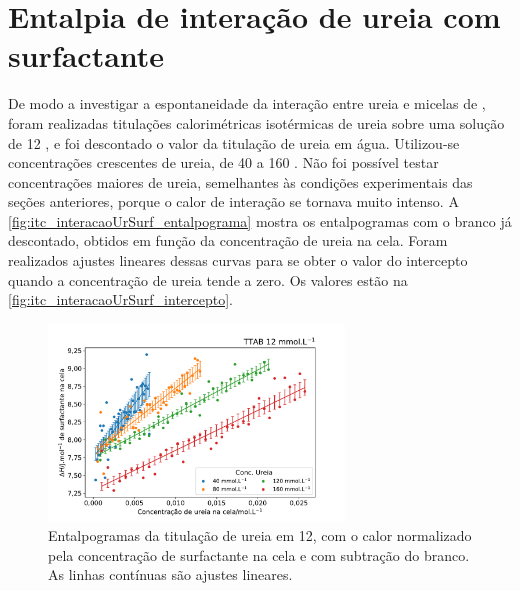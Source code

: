 
%
\FloatBarrier
\section{Entalpia de interação de ureia com surfactante}

	De modo a investigar a espontaneidade da interação entre ureia e micelas de \TTAB{}, foram realizadas titulações calorimétricas isotérmicas de ureia sobre uma solução de \TTAB{} 12 \mM, e foi descontado o valor da titulação de ureia em água. Utilizou-se concentrações crescentes de ureia, de 40 a 160 \mM. Não foi possível testar concentrações maiores de ureia, semelhantes às condições experimentais das seções anteriores, porque o calor de interação se tornava muito intenso. A \autoref{fig:itc_interacaoUrSurf_entalpograma} mostra os entalpogramas com o branco já descontado, obtidos em função da concentração de ureia na cela. Foram realizados ajustes lineares  dessas curvas para se obter o valor do intercepto quando a concentração de ureia tende a zero. Os valores estão na \autoref{fig:itc_interacaoUrSurf_intercepto}.
	

\begin{figure}[h]
	\centering
	\includegraphics[width=0.7\textwidth]{imagens/itc/interacao_ureia_surf}
	\caption{Entalpogramas da titulação de ureia em \TTAB{} 12\mM, com o calor normalizado pela concentração de surfactante na cela e com subtração do branco. As linhas contínuas são ajustes lineares.}
	\label{fig:itc_interacaoUrSurf_entalpograma}
\end{figure}


